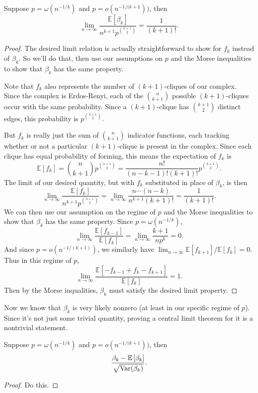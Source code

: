 \documentclass[twoside,10pt]{report}
\begin{document}
\begin{thrm}[]
	Suppose $p=\omega(n^{-1/k})$ and $p=o(n^{-1/(k+1}))$, then
\[
	\lim_{n \to \infty} \frac{\mathbb{E}[\beta_{k}]}{n^{k+1}p^{\binom{k+1}{2}}} = \frac{1}{(k+1)!} .
\] 
\end{thrm}
\begin{proof}
	The desired limit relation is actually straightforward to show for $f_{k}$ instead of $\beta_{k}$. So we'll do that, then use our assumptions on $p$ and the Morse inequalities to show that $\beta_{k}$ has the same property.

	Note that $f_{k}$ also represents the number of $(k+1)$-cliques of our complex. Since the complex is Erdos-Renyi, each of the $\binom{n}{k+1}$ possible $(k+1)$-cliques occur with the same probability. Since a $(k+1)$-clique has $\binom{k+1}{2}$ distinct edges, this probability is $p^{\binom{k+1}{2}}$.

	But $f_k$ is really just the sum of $\binom{n}{k+1}$ indicator functions, each tracking whether or not a particular $(k+1)$-clique is present in the complex. Since each clique has equal probability of forming, this means the expectation of $f_{k}$ is
	\[
		\mathbb{E}[f_{k}] = \binom{n}{k+1}p^{\binom{k+1}{2}} = \frac{n!}{(n-k-1)!(k+1)!} p^{\binom{k+1}{2}}.
	\] The limit of our desired quantity, but with $f_{k}$ substituted in place of $\beta_{k}$, is then
	\[
		\lim_{n \to \infty} \frac{\mathbb{E}[f_{k}]}{n^{k+1}p^{\binom{k+1}{2}}} = \lim_{n \to \infty} \frac{n \cdots (n-k)}{n^{k+1}(k+1)!} = \frac{1}{(k+1)!}.
	\] 
	We can then use our assumption on the regime of $p$ and the Morse inequalities to show that $\beta_{k}$ has the same property. Since $p = \omega(n^{-1/k})$,
	\[
		\lim_{n \to \infty} \frac{\mathbb{E}[f_{k-1}]}{\mathbb{E}[f_k]} = \lim_{n \to \infty} \frac{k+1}{n p^{k}} = 0.
	\] And since $p= o(n^{-1/(k+1)})$, we similarly have $\lim_{n \to \infty} \mathbb{E}\left[ f_{k+1} \right] / \mathbb{E}\left[ f_{k} \right] =0$. Thus in this regime of $p$,
	\[
	\lim_{n \to \infty} \frac{\mathbb{E}\left[ -f_{k-1}+f_{k}-f_{k+1} \right]}{\mathbb{E}\left[ f_{k} \right]}=1.
	\] 
	Then by the Morse inqualities, $\beta_{k}$ must satisfy the desired limit property.
\end{proof}

Now we know that $\beta_{k}$ is very likely nonzero (at least in our specific regime of $p$). Since it's not just some trivial quantity, proving a central limit theorem for it is a nontrivial statement.

\begin{thrm}[]
Suppose $p=\omega(n^{-1/k})$ and $p=o(n^{-1/(k+1}))$, then
\[
	\frac{\beta_{k}- \mathbb{E}\left[ \beta_{k} \right]}{\sqrt{\operatorname{Var}(\beta_{k})} } .
\] 
\end{thrm}
\begin{proof}
	{\color{red}Do this.}
\end{proof}
\end{document}
